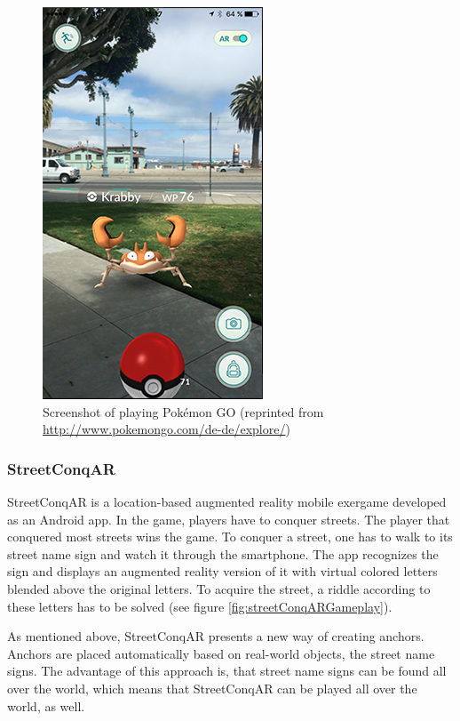 \begin{figure}[bth]
  \centering
        \includegraphics[width=.45\linewidth]{gfx/pokemon_go_gameplay}
        \caption{Screenshot of playing Pokémon GO (reprinted from \url{http://www.pokemongo.com/de-de/explore/})}
        \label{fig:pokemonGOGameplay}
\end{figure}

\subsubsection{StreetConqAR}
StreetConqAR \citep{hock2014augmented} is a location-based augmented reality mobile exergame developed as an Android app. In the game, players have to conquer streets. The player that conquered most streets wins the game. To conquer a street, one has to walk to its street name sign and watch it through the smartphone. The app recognizes the sign and displays an augmented reality version of it with virtual colored letters blended above the original letters. To acquire the street, a riddle according to these letters has to be solved (see figure \ref{fig:streetConqARGameplay}).

As mentioned above, StreetConqAR presents a new way of creating anchors. Anchors are placed automatically based on real-world objects, the street name signs. The advantage of this approach is, that street name signs can be found all over the world, which means that StreetConqAR can be played all over the world, as well.

